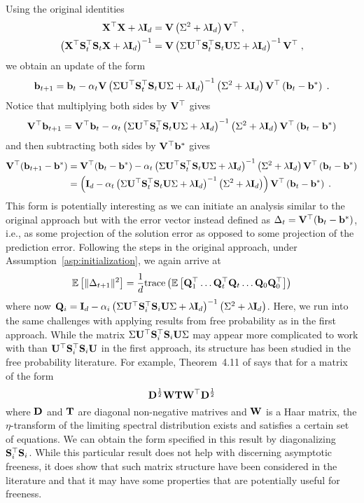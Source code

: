 Using the original identities
\begin{align*}
\mathbf{X}^\top\mathbf{X}+\lambda\mathbf{I}_d &= \mathbf{V}\left(\Sigma^2+ \lambda\mathbf{I}_d\right)\mathbf{V}^\top \;, \\
\left(\mathbf{X}^\top\mathbf{S}_t^\top\mathbf{S}_t\mathbf{X} + \lambda\mathbf{I}_d\right)^{-1} &= \mathbf{V}\left(\Sigma\mathbf{U}^\top\mathbf{S}_t^\top\mathbf{S}_t\mathbf{U}\Sigma + \lambda\mathbf{I}_d\right)^{-1}\mathbf{V}^\top \;,
\end{align*}
we obtain an update of the form
\[
\mathbf{b}_{t+1} = \mathbf{b}_t - \alpha_t\mathbf{V}\left(\Sigma\mathbf{U}^\top\mathbf{S}_t^\top\mathbf{S}_t\mathbf{U}\Sigma + \lambda\mathbf{I}_d\right)^{-1}\left(\Sigma^2 + \lambda\mathbf{I}_d \right)\mathbf{V}^\top\left(\mathbf{b}_t-\mathbf{b}^*\right) \;.
\]
Notice that multiplying both sides by $\mathbf{V}^\top$ gives
\[
\mathbf{V}^\top\mathbf{b}_{t+1} = \mathbf{V}^\top\mathbf{b}_t - \alpha_t\left(\Sigma\mathbf{U}^\top\mathbf{S}_t^\top\mathbf{S}_t\mathbf{U}\Sigma + \lambda\mathbf{I}_d\right)^{-1}\left(\Sigma^2 + \lambda\mathbf{I}_d \right)\mathbf{V}^\top\left(\mathbf{b}_t-\mathbf{b}^*\right)
\]
and then subtracting both sides by $\mathbf{V}^\top\mathbf{b}^*$ gives
\begin{align*}
\mathbf{V}^\top(\mathbf{b}_{t+1}-\mathbf{b}^*) &= \mathbf{V}^\top(\mathbf{b}_t-\mathbf{b}^*) - \alpha_t\left(\Sigma\mathbf{U}^\top\mathbf{S}_t^\top\mathbf{S}_t\mathbf{U}\Sigma + \lambda\mathbf{I}_d\right)^{-1}\left(\Sigma^2 + \lambda\mathbf{I}_d \right)\mathbf{V}^\top\left(\mathbf{b}_t-\mathbf{b}^*\right) \\
&= \left(\mathbf{I}_d - \alpha_t\left(\Sigma\mathbf{U}^\top\mathbf{S}_t^\top\mathbf{S}_t\mathbf{U}\Sigma + \lambda\mathbf{I}_d\right)^{-1}\left(\Sigma^2 + \lambda\mathbf{I}_d \right)\right)\mathbf{V}^\top\left(\mathbf{b}_t-\mathbf{b}^*\right) \;.
\end{align*}
This form is potentially interesting as we can initiate an analysis similar to the original approach but with the error vector instead defined as $\Delta_t=\mathbf{V}^\top(\mathbf{b}_t-\mathbf{b}^*)$, i.e., as some projection of the solution error as opposed to some projection of the prediction error. Following the steps in the original approach, under Assumption~\ref{asp:initialization}, we again arrive at
\[
\mathbb{E}\left[\|\Delta_{t+1}\|^2\right] = \frac{1}{d}\mathrm{trace}\left(\mathbb{E}\left[\mathbf{Q}_1^\top\ldots \mathbf{Q}_t^\top\mathbf{Q}_t\ldots\mathbf{Q}_0\mathbf{Q}_0^\top\right]\right)
\]
where now $\mathbf{Q}_i = \mathbf{I}_d-\alpha_i\left(\Sigma\mathbf{U}^\top\mathbf{S}_i^\top\mathbf{S}_i\mathbf{U}\Sigma + \lambda\mathbf{I}_d\right)^{-1}\left(\Sigma^2 + \lambda\mathbf{I}_d \right)$. Here, we run into the same challenges with applying results from free probability as in the first approach. While the matrix $\Sigma\mathbf{U}^\top\mathbf{S}_i^\top\mathbf{S}_i\mathbf{U}\Sigma$ may appear more complicated to work with than $\mathbf{U}^\top\mathbf{S}_i^\top\mathbf{S}_i\mathbf{U}$ in the first approach, its structure has been studied in the free probability literature. For example, Theorem~4.11 of \citep{Couillet:2011_free} says that for a matrix of the form
\[
\mathbf{D}^\frac{1}{2}\mathbf{W}\mathbf{T}\mathbf{W}^\top\mathbf{D}^\frac{1}{2}
\]
where $\mathbf{D}$ and $\mathbf{T}$ are diagonal non-negative matrives and $\mathbf{W}$ is a Haar matrix, the $\eta$-transform of the limiting spectral distribution exists and satisfies a certain set of equations. We can obtain the form specified in this result by diagonalizing $\mathbf{S}_i^\top\mathbf{S}_i$. While this particular result does not help with discerning asymptotic freeness, it does show that such matrix structure have been considered in the literature and that it may have some properties that are potentially useful for freeness.


